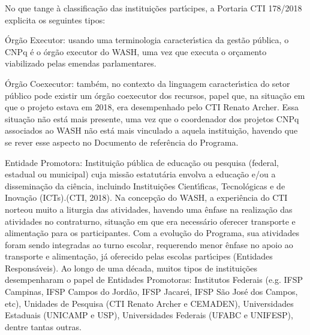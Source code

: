 \documentclass[
12pt,		%
openright,	%
twoside,  %
a4paper,			%
chapter=TITLE,		%
english,			%
french,				%
spanish,			%
brazil				%
]{USPSC-classe/USPSC}
\begin{document}
No que tange \`a classifica\c{c}\~ao das institui\c{c}\~oes part\'{\i}cipes, a Portaria CTI 178/2018 explicita os seguintes tipos:










\begin{alineas}
\item \'Org\~ao Executor: usando uma terminologia caracter\'{\i}stica da gest\~ao p\'ublica, o CNPq \'e o \'org\~ao executor do WASH, uma vez que executa o or\c{c}amento viabilizado pelas emendas parlamentares.
\item \'Org\~ao Coexecutor: tamb\'em, no contexto da linguagem caracter\'{\i}stica do setor p\'ublico pode existir um \'org\~ao coexecutor dos recursos, papel que, na situa\c{c}\~ao em que o projeto estava em 2018, era desempenhado pelo CTI Renato Archer. Essa situa\c{c}\~ao n\~ao est\'a mais presente, uma vez que o coordenador dos projetos CNPq associados ao WASH n\~ao est\'a mais vinculado a aquela institui\c{c}\~ao, havendo que se rever esse aspecto no Documento de refer\^encia do Programa.
\item Entidade Promotora: \textquotedbl Institui\c{c}\~ao p\'ublica de educa\c{c}\~ao ou pesquisa (federal, estadual ou municipal) cuja miss\~ao estatut\'aria envolva a educa\c{c}\~ao e/ou a dissemina\c{c}\~ao da ci\^encia, incluindo Institui\c{c}\~oes Cient\'{\i}ficas, Tecnol\'ogicas e de Inova\c{c}\~ao (ICTs).\textquotedbl  (CTI, 2018). Na concep\c{c}\~ao do WASH, a experi\^encia do CTI norteou muito a \textquotedbl  liturgia \textquotedbl  das atividades, havendo uma \^enfase na realiza\c{c}\~ao das atividades no contraturno, situa\c{c}\~ao em que era necess\'ario oferecer transporte e alimenta\c{c}\~ao para os participantes. Com a evolu\c{c}\~ao do Programa, sua atividades foram sendo integradas ao turno escolar, requerendo menor \^enfase no apoio ao transporte e alimenta\c{c}\~ao, j\'a oferecido pelas escolas part\'{\i}cipes (Entidades Respons\'aveis). Ao longo de uma d\'ecada, muitos tipos de institui\c{c}\~oes desempenharam o papel de Entidades Promotoras: Institutos Federais (e.g. IFSP Campinas, IFSP Campos do Jord\~ao, IFSP Jacare\'{\i}, IFSP S\~ao Jos\'e dos Campos, etc), Unidades de Pesquisa (CTI Renato Archer e CEMADEN), Universidades Estaduais (UNICAMP e USP), Universidades Federais (UFABC e UNIFESP), dentre tantas outras.

\end{alineas}
\end{document}
